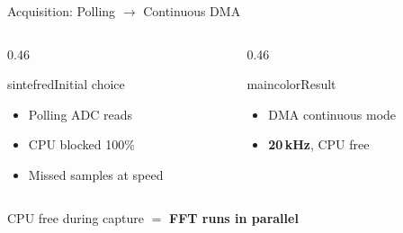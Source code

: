 
\begin{frame}{Acquisition: Polling $\rightarrow$ Continuous DMA}
\begin{columns}[T,onlytextwidth]
\begin{column}{0.46\textwidth}
  \begin{colorblock}[white]{sintefred}{Initial choice}
  \large
  \begin{itemize}
    \item Polling ADC reads
    \item CPU blocked 100\%
    \item Missed samples at speed
  \end{itemize}
  \end{colorblock}
\end{column}
\begin{column}{0.46\textwidth}
  \begin{colorblock}[white]{maincolor}{Result}
  \large
  \begin{itemize}
    \item DMA continuous mode
    \item \textbf{20\,kHz}, CPU free
  \end{itemize}
  \end{colorblock}
\end{column}
\end{columns}
\vspace{0.5cm}
\centering
{\Large CPU free during capture $=$ \textbf{FFT runs in parallel}}
\end{frame}

